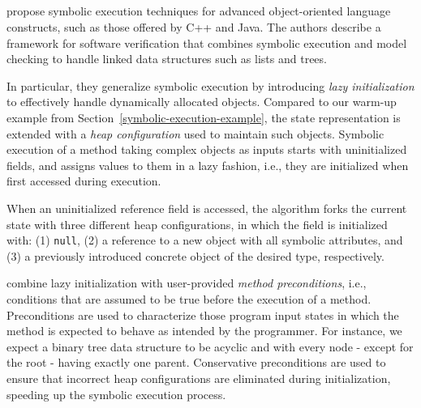 %

\subsection{}
\label{ss:complex-objects}

\cite{KPV-TACAS03} propose symbolic execution techniques for advanced object-oriented language constructs, such as those offered by C++ and Java. The authors describe a framework for software verification that combines symbolic execution and model checking to handle linked data structures such as lists and trees. %

In particular, they generalize symbolic execution by introducing {\em lazy initialization} to effectively handle dynamically allocated objects. Compared to our warm-up example from Section~\ref{symbolic-execution-example}, the state representation is extended with a {\em heap configuration} used to maintain such objects. Symbolic execution of a method taking complex objects as inputs starts with uninitialized fields, and assigns values to them in a lazy fashion, i.e., they are initialized when first accessed during execution.

When an uninitialized reference field is accessed, the algorithm forks the current state with three different heap configurations, in which the field is initialized with: (1) {\tt null}, (2) a reference to a new object with all symbolic attributes, and (3) a previously introduced concrete object of the desired type, respectively. 

\cite{KPV-TACAS03,SPF-ISSTA04} combine lazy initialization with user-provided {\em method preconditions}, i.e., conditions that are assumed to be true before the execution of a method. Preconditions are used to characterize those program input states in which the method is expected to behave as intended by the programmer. For instance, we expect a binary tree data structure to be acyclic and with every node - except for the root - having exactly one parent. Conservative preconditions are used to ensure that incorrect heap configurations are eliminated during initialization, speeding up the symbolic execution process. %

